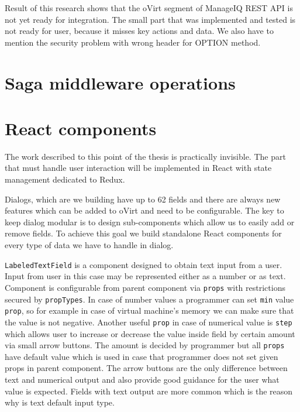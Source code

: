 Result of this research shows that the oVirt segment of ManageIQ REST API is not yet ready for integration. The small part that was implemented and tested is not ready for user, because it misses key actions and data. We also have to mention the security problem with wrong header for OPTION method.

\section{Saga middleware operations}

\section{React components}
The work described to this point of the thesis is practically invisible. The part that must handle user interaction will be implemented in React with state management dedicated to Redux. 

Dialogs, which are we building have up to 62 fields and there are always new features which can be added to oVirt and need to be configurable. The key to keep dialog modular is to design sub-components which allow us to easily add or remove fields. To achieve this goal we build standalone React components for every type of data we have to handle in dialog.

\texttt{LabeledTextField} is a component designed to obtain text input from a user. Input from user in this case may be represented either as a number or as text. Component is configurable from parent component via \texttt{props} with restrictions secured by \texttt{propTypes}.
In case of number values a programmer can set \texttt{min} value \texttt{prop}, so for example in case of virtual machine's memory we can make sure that the value is not negative. Another useful \texttt{prop} in case of numerical value is \texttt{step} which allows user to increase or decrease the value inside field by certain amount via small arrow buttons. The amount is decided by programmer but all \texttt{props} have default value which is used in case that programmer does not set given props in parent component. The arrow buttons are the only difference between text and numerical output and also provide good guidance for the user what value is expected.
Fields with text output are more common which is the reason why is text default  input type. 

